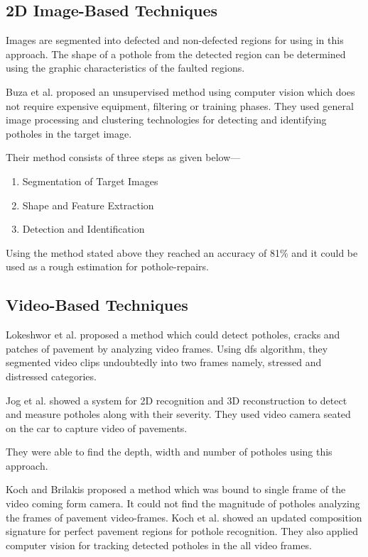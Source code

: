     \subsection{2D Image-Based Techniques}
        Images are segmented into defected and non-defected regions for using in this approach\cite{akagic17,koch11,kim14}. The shape of a pothole from the detected region can be determined using the graphic characteristics of the faulted regions.
        
        \vspace{8mm}
        Buza et al.\cite{buza2013stereo} proposed an unsupervised method using computer vision which does not require expensive equipment, filtering or training phases\cite{buza2013stereo,ryu2015image}. They used general image processing and clustering technologies for detecting and identifying potholes in the target image\cite{kim14}.
        
        \clearpage
        Their method consists of three steps as given below---
        \begin{enumerate}
            \item {Segmentation of Target Images}
            \item{Shape and Feature Extraction}
            \item{Detection and Identification}
        \end{enumerate}
        Using the method stated above they reached an accuracy of 81\%\cite{kim14} and it could be used as a rough estimation for pothole-repairs.
        
    \subsection{Video-Based Techniques}
        Lokeshwor et al.\cite{huidrom2013method} proposed a method which could detect potholes, cracks and patches of pavement by analyzing video frames. Using \acrshort{dfs} algorithm\cite{huidrom2013method,kim14}, they segmented video clips undoubtedly into two frames namely, stressed and distressed categories.
        
        \vspace{8mm}
        Jog et al.\cite{jog2012pothole} showed a system for 2D recognition and 3D reconstruction\cite{jog2012pothole} to detect and measure potholes along with their severity. They used video camera seated on the car to capture video of pavements.
        
        They were able to find the depth, width and number of potholes using this approach.
        
        \vspace{8mm}
        Koch and Brilakis\cite{koch2013pothole} proposed a method which was bound to single frame of the video coming form camera. It could not find the magnitude of potholes analyzing the frames of pavement video-frames\cite{kim14}. Koch et al. showed an updated composition signature for perfect pavement regions for pothole recognition. They also applied computer vision for tracking detected potholes in the all video frames\cite{koch2013pothole}.
